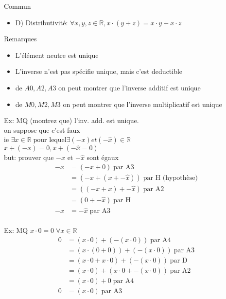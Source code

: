 \documentclass{article}
\newcommand{\reals}{\mathbb{R}}
\begin{document}
Commun
\begin{itemize}
    \item D) Distributivité: $\forall x, y, z \in \reals, x \cdot (y + z) = x \cdot y + x \cdot z$
\end{itemize}

Remarques
\begin{itemize}
    \item L’élément neutre est unique
    \item L'inverse n'est pas spécifie unique, mais c'est deductible
    \item de $A0, A2, A3$ on peut montrer que l'inverse additif est unique
    \item de $M0, M2, M3$ on peut montrer que l'inverse multiplicatif est unique

\end{itemize}

Ex: MQ (montrez que) l'inv. add.  est unique.\\
on suppose que c'est faux\\
ie $\exists x \in \reals \; \text{pour lequel} \exists (-x) et (-\hat{x}) \in \reals$ \\
$x + (-x) = 0,  x + (-\hat{x} = 0)$ \\
but: prouver que $-x$ et $-\hat{x}$ sont égaux \\

\begin{equation}
\begin{aligned}
    -x &= (-x + 0) \; \text{par A3} \\
       &= (-x + (x + - \hat{x})) \; \text{par H (hypothèse)} \\
       &= ((-x + x) + - \hat{x}) \; \text{par A2} \\
       &= (0 + - \hat{x}) \; \text{par H} \\
    -x &= - \hat{x} \; \text{par A3} \\
\end{aligned}
\end{equation}

Ex: MQ $x \cdot 0  = 0 \; \forall x \in \reals$ \\

\begin{equation}
\begin{aligned}
    0 &=  (x \cdot 0) + (- (x \cdot 0)) \; \text{par A4} \\
      &=  (x \cdot (0 + 0)) + (- (x \cdot 0)) \; \text{par A3} \\
      &=  (x \cdot 0 + x \cdot 0) + (- (x \cdot 0)) \; \text{par D} \\
      &=  (x \cdot 0) + (x \cdot 0 + - (x \cdot 0)) \; \text{par A2} \\
      &=  (x \cdot 0) + 0 \; \text{par A4} \\
    0 &=  (x \cdot 0) \; \text{par A3} \\
\end{aligned}
\end{equation}
\end{document}
